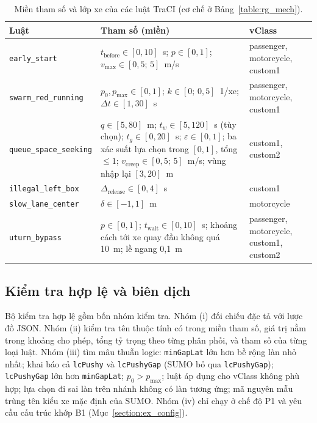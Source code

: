 \documentclass[../main.tex]{subfiles}
\begin{document}
\begin{table}[!htbp]
\centering
\small
\caption{Miền tham số và lớp xe của các luật TraCI (cơ chế ở Bảng~\ref{table:rg_mech}).}
\label{table:3.2}
\begin{tabular}{|>{\raggedright\arraybackslash}p{2.9cm}|>{\raggedright\arraybackslash}p{7.4cm}|>{\raggedright\arraybackslash}p{3.3cm}|}
\hline
\textbf{Luật} & \textbf{Tham số (miền)} & \textbf{vClass} \\ \hline
\texttt{early\_\allowbreak start} & $t_{\text{before}} \in [0,10]$~s; $p \in [0,1]$; $v_{\max} \in [0{,}5;\,5]$~m/s & passenger, motorcycle, custom1 \\ \hline
\texttt{swarm\_\allowbreak red\_\allowbreak running} & $p_0, p_{\max} \in [0,1]$; $k \in [0;\,0{,}5]$~1/xe; $\Delta t \in [1,30]$~s & passenger, motorcycle, custom1 \\ \hline
\texttt{queue\_\allowbreak space\_\allowbreak seeking} & $q \in [5,80]$~m; $t_w \in [5,120]$~s (tùy chọn); $t_{g} \in [0,20]$~s; $\varepsilon \in [0,1]$; ba xác suất lựa chọn trong $[0,1]$, tổng $\le 1$; $v_{\text{creep}} \in [0{,}5;\,5]$~m/s; vùng nhập lại $[3,20]$~m & custom1, custom2 \\ \hline
\texttt{illegal\_\allowbreak left\_\allowbreak box} & $\Delta_{\text{release}} \in [0,4]$~s & custom1 \\ \hline
\texttt{slow\_\allowbreak lane\_\allowbreak center} & $\delta \in [-1,1]$~m & motorcycle \\ \hline
\texttt{uturn\_\allowbreak bypass} & $p \in [0,1]$; $t_{\text{wait}} \in [0,10]$~s; khoảng cách tới xe quay đầu không quá 10~m; lề ngang 0,1~m & passenger, motorcycle, custom1, custom2 \\ \hline
\end{tabular}
\end{table}

\subsection{Kiểm tra hợp lệ và biên dịch}
\label{subsection:impl_validator}

Bộ kiểm tra hợp lệ gồm bốn nhóm kiểm tra. Nhóm (i) đối chiếu đặc tả với lược đồ JSON. Nhóm (ii) kiểm tra tên thuộc tính có trong miền tham số, giá trị nằm trong khoảng cho phép, tổng tỷ trọng theo từng phân phối, và tham số của từng loại luật. Nhóm (iii) tìm mâu thuẫn logic: \texttt{minGapLat} lớn hơn bề rộng làn nhỏ nhất; khai báo cả \texttt{lcPushy} và \texttt{lcPushyGap} (SUMO bỏ qua \texttt{lcPushyGap}); \texttt{lcPushyGap} lớn hơn \texttt{minGapLat}; $p_0 > p_{\max}$; luật áp dụng cho vClass không phù hợp; lựa chọn đi sai làn trên nhánh không có làn tương ứng; mã nguyên mẫu trùng tên kiểu xe mặc định của SUMO. Nhóm (iv) chỉ chạy ở chế độ P1 và yêu cầu cấu trúc khớp B1 (Mục~\ref{section:ex_config}).
\end{document}
